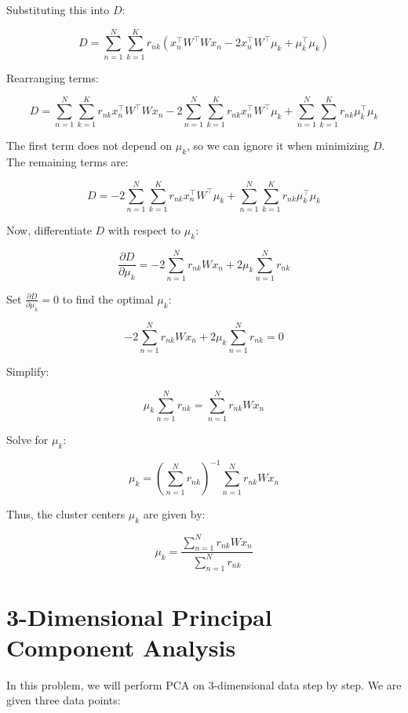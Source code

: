 \documentclass{article}
\begin{document}
\begin{enumerate}
    Substituting this into \( D \):

    \[
    D = \sum_{n=1}^N \sum_{k=1}^K r_{nk} \left( x_n^\top W^\top W x_n - 2 x_n^\top W^\top \mu_k + \mu_k^\top \mu_k \right)
    \]

    Rearranging terms:

    \[
    D = \sum_{n=1}^N \sum_{k=1}^K r_{nk} x_n^\top W^\top W x_n - 2 \sum_{n=1}^N \sum_{k=1}^K r_{nk} x_n^\top W^\top \mu_k + \sum_{n=1}^N \sum_{k=1}^K r_{nk} \mu_k^\top \mu_k
    \]

    The first term does not depend on \(\mu_k\), so we can ignore it when minimizing \( D \). The remaining terms are:

    \[
    D = -2 \sum_{n=1}^N \sum_{k=1}^K r_{nk} x_n^\top W^\top \mu_k + \sum_{n=1}^N \sum_{k=1}^K r_{nk} \mu_k^\top \mu_k
    \]

    Now, differentiate \( D \) with respect to \(\mu_k\):

    \[
    \frac{\partial D}{\partial \mu_k} = -2 \sum_{n=1}^N r_{nk} W x_n + 2 \mu_k \sum_{n=1}^N r_{nk}
    \]

    Set \(\frac{\partial D}{\partial \mu_k} = 0\) to find the optimal \(\mu_k\):

    \[
    -2 \sum_{n=1}^N r_{nk} W x_n + 2 \mu_k \sum_{n=1}^N r_{nk} = 0
    \]

    Simplify:

    \[
    \mu_k \sum_{n=1}^N r_{nk} = \sum_{n=1}^N r_{nk} W x_n
    \]

    Solve for \(\mu_k\):

    \[
    \mu_k = \left( \sum_{n=1}^N r_{nk} \right)^{-1} \sum_{n=1}^N r_{nk} W x_n
    \]

    Thus, the cluster centers \(\mu_k\) are given by:


    \[
    \mu_k = \frac{\sum_{n=1}^N r_{nk}Wx_n}{\sum_{n=1}^N r_{nk}}
    \]

\end{enumerate}



\clearpage

\section{3-Dimensional Principal Component Analysis}

In this problem, we will perform PCA on 3-dimensional data step by step. We are given three data points:
\end{document}
